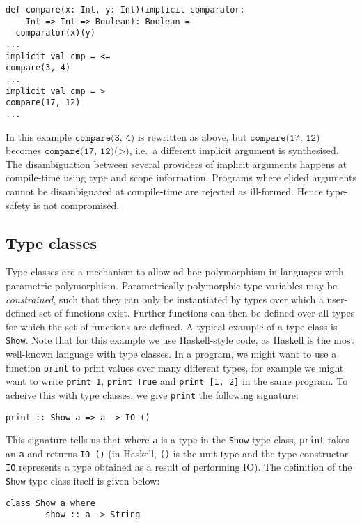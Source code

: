 \begin{minipage}{\linewidth}
\begin{lstlisting}[mathescape]
def compare(x: Int, y: Int)(implicit comparator:
    Int => Int => Boolean): Boolean =
  comparator(x)(y)
...
implicit val cmp = <=
compare(3, 4)
...
implicit val cmp = >
compare(17, 12)
...
\end{lstlisting}
\end{minipage}

\noindent In this example $\texttt{compare(3, 4)}$ is rewritten as above, but
$\texttt{compare(17, 12)}$ becomes $\texttt{compare(17, 12)(>)}$, i.e.~a
different implicit argument is synthesised. The disambiguation between several
providers of implicit arguments happens at compile-time using type and scope
information. Programs where elided arguments cannot be disambiguated at
compile-time are rejected as ill-formed. Hence type-safety is not compromised.

\subsection{Type classes}
Type classes \cite{K88, WB89} are a mechanism to allow ad-hoc polymorphism in
languages with parametric polymorphism. Parametrically polymorphic type
variables may be \emph{constrained}, such that they can only be instantiated by
types over which a user-defined set of functions exist. Further functions can
then be defined over all types for which the set of functions are defined. A
typical example of a type class is \texttt{Show}. Note that for this example we
use Haskell-style code, as Haskell is the most well-known language with type
classes. In a program, we might want to use a function \texttt{print} to print
values over many different types, for example we might want to write
\texttt{print 1}, \texttt{print True} and \texttt{print [1, 2]} in the same
program. To acheive this with type classes, we give \texttt{print} the following
signature:
\begin{lstlisting}[mathescape]
    print :: Show a => a -> IO ()
\end{lstlisting}

\noindent This signature tells us that where \texttt{a} is a type in the
\texttt{Show} type class, \texttt{print} takes an \texttt{a} and returns
\texttt{IO ()} (in Haskell, \texttt{()} is the unit type and the type
constructor \texttt{IO} represents a type obtained as a result of performing
IO). The definition of the \texttt{Show} type class itself is given below:
\begin{lstlisting}[mathescape]
    class Show a where
        show :: a -> String
\end{lstlisting}

